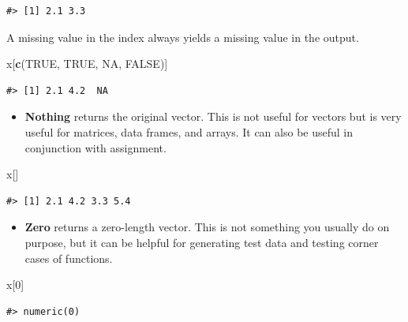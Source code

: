 \documentclass[]{book}
\newenvironment{Shaded}{\begin{snugshade}}{\end{snugshade}}
\newcommand{\KeywordTok}[1]{\textcolor[rgb]{0.13,0.29,0.53}{\textbf{#1}}}
\newcommand{\DecValTok}[1]{\textcolor[rgb]{0.00,0.00,0.81}{#1}}
\newcommand{\OtherTok}[1]{\textcolor[rgb]{0.56,0.35,0.01}{#1}}
\newcommand{\NormalTok}[1]{#1}
\providecommand{\tightlist}{%
  \setlength{\itemsep}{0pt}\setlength{\parskip}{0pt}}
\theoremstyle{definition}
\theoremstyle{definition}
\theoremstyle{definition}
\theoremstyle{remark}
\begin{document}
\begin{verbatim}
#> [1] 2.1 3.3
\end{verbatim}

A missing value in the index always yields a missing value in the
output.

\begin{Shaded}
\begin{Highlighting}[]
\NormalTok{x[}\KeywordTok{c}\NormalTok{(}\OtherTok{TRUE}\NormalTok{, }\OtherTok{TRUE}\NormalTok{, }\OtherTok{NA}\NormalTok{, }\OtherTok{FALSE}\NormalTok{)]}
\end{Highlighting}
\end{Shaded}

\begin{verbatim}
#> [1] 2.1 4.2  NA
\end{verbatim}

\begin{itemize}
\tightlist
\item
  \textbf{Nothing} returns the original vector. This is not useful for
  vectors but is very useful for matrices, data frames, and arrays. It
  can also be useful in conjunction with assignment.
\end{itemize}

\begin{Shaded}
\begin{Highlighting}[]
\NormalTok{x[]}
\end{Highlighting}
\end{Shaded}

\begin{verbatim}
#> [1] 2.1 4.2 3.3 5.4
\end{verbatim}

\begin{itemize}
\tightlist
\item
  \textbf{Zero} returns a zero-length vector. This is not something you
  usually do on purpose, but it can be helpful for generating test data
  and testing corner cases of functions.
\end{itemize}

\begin{Shaded}
\begin{Highlighting}[]
\NormalTok{x[}\DecValTok{0}\NormalTok{]}
\end{Highlighting}
\end{Shaded}

\begin{verbatim}
#> numeric(0)
\end{verbatim}
\end{document}
